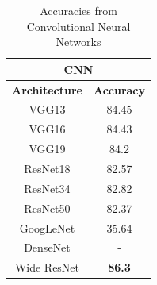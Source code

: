 \begin{table}[]
\centering
\begin{tabular}{cc}
\hline
\multicolumn{2}{c}{\textbf{CNN}}          \\ \hline
\textbf{Architecture} & \textbf{Accuracy} \\ \hline
VGG13                 & 84.45             \\ \hline
VGG16                 & 84.43             \\ \hline
VGG19                 & 84.2              \\ \hline
ResNet18              & 82.57             \\ \hline
ResNet34              & 82.82             \\ \hline
ResNet50              & 82.37             \\ \hline
GoogLeNet             & 35.64             \\ \hline
DenseNet              & -                 \\ \hline
Wide ResNet           & \textbf{86.3}     \\ \hline
\end{tabular}
\caption{Accuracies from Convolutional Neural Networks}
\label{tab:cnn_accuracies}
\end{table}

